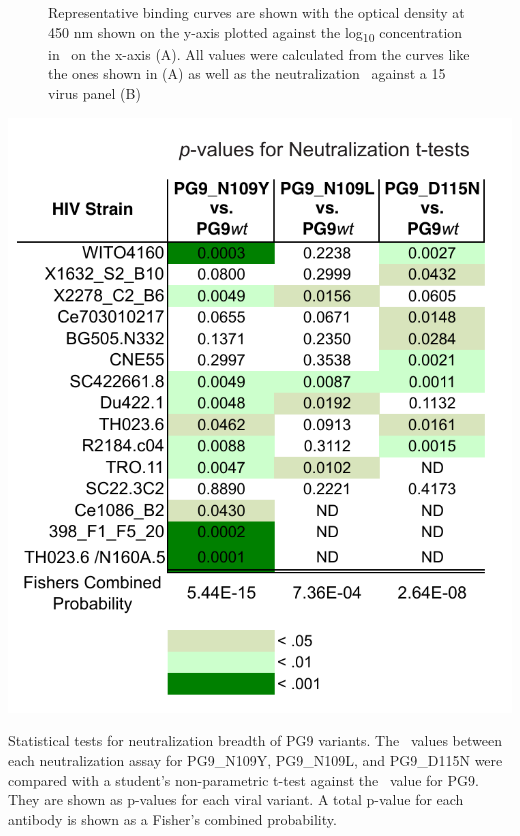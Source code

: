 \begin{figure}[!t]
   \caption[Experimental Analysis of PG9 Variants]{Representative binding curves are shown with the optical density at 450 nm shown on the y-axis plotted against the log\textsubscript{10} concentration in \mcml~on the x-axis (A). All \ec values were calculated from the curves like the ones shown in (A) as well as the neutralization \ic~against a 15 virus panel (B)}
   \label{fig:figure4_4}
\end{figure}

\begin{table}[!t]
    \centering
    \includegraphics[scale=.8]{tables/chapter4/table4_1.pdf}
    \caption[Statistical Tests for Neutralization Breadth of PG9 Variants]{Statistical tests for neutralization breadth of PG9 variants. The \ic~values between each neutralization assay for PG9\_N109Y, PG9\_N109L, and PG9\_D115N were compared with a student's non-parametric t-test against the \ic~value for PG9. They are shown as p-values for each viral variant. A total p-value for each antibody is shown as a Fisher's combined probability.}
    \label{tab:table4_1}
\end{table}


